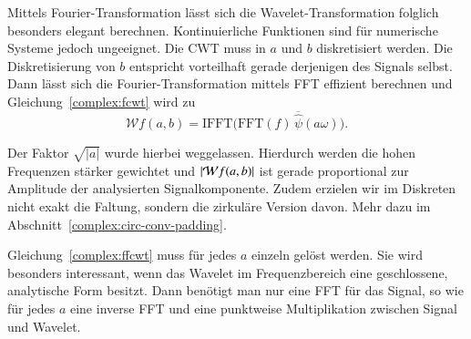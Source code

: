 Mittels Fourier-Transformation lässt sich die Wavelet-Transformation folglich besonders elegant berechnen.
Kontinuierliche Funktionen sind für numerische Systeme jedoch ungeeignet.
Die CWT muss in $a$ und $b$ diskretisiert werden.
Die Diskretisierung von $b$ entspricht vorteilhaft gerade derjenigen des Signals selbst.
Dann lässt sich die Fourier-Transformation mittels FFT effizient berechnen und Gleichung~\eqref{complex:fcwt} wird zu
\begin{equation}
	\mathcal{W}f(a,b) = \text{IFFT}\bigl(\text{FFT}(f) \, \overline{\hat{\psi}}(a\omega)\bigr). \label{complex:ffcwt}
\end{equation}

Der Faktor $\sqrt{|a|}$ wurde hierbei weggelassen.
Hierdurch werden die hohen Frequenzen stärker gewichtet und $|\!\Wave f(a,b)|$ ist gerade proportional zur Amplitude der analysierten Signalkomponente.
Zudem erzielen wir im Diskreten nicht exakt die Faltung, sondern die zirkuläre Version davon. 
Mehr dazu im Abschnitt~\ref{complex:circ-conv-padding}.

Gleichung~\eqref{complex:ffcwt} muss für jedes $a$ einzeln gelöst werden.
Sie wird besonders interessant, wenn das Wavelet im Frequenzbereich eine geschlossene, analytische Form besitzt.
Dann benötigt man nur eine FFT für das Signal, so wie für jedes $a$ eine inverse FFT und eine punktweise Multiplikation zwischen Signal und Wavelet.

\clearpage
